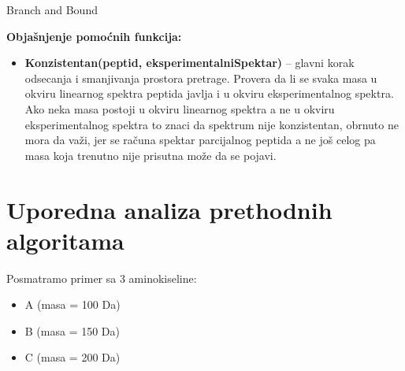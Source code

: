 \documentclass[12pt,oneside]{memoir}
\begin{document}
\begin{algorithm}[H]
\label{alg:branch_and_bound}
\caption{Branch and Bound}
\SetAlgoLined
\DontPrintSemicolon
{}
\end{algorithm}

\noindent
\textbf{Objašnjenje pomoćnih funkcija:}
\begin{itemize}
  \item \textbf{Konzistentan(peptid, eksperimentalniSpektar)} – glavni korak odsecanja i smanjivanja prostora pretrage.  Provera da li se svaka masa u okviru linearnog spektra peptida javlja i u okviru eksperimentalnog spektra. Ako neka masa postoji u okviru linearnog spektra a ne u okviru eksperimentalnog spektra to znaci da spektrum nije konzistentan, obrnuto ne mora da važi, jer se računa spektar parcijalnog peptida a ne još celog pa masa koja trenutno nije prisutna može da se pojavi.
\end{itemize}

\section{Uporedna analiza prethodnih algoritama}

Posmatramo primer sa 3 aminokiseline:
\begin{itemize}
    \item A (masa = 100 Da)
    \item B (masa = 150 Da)
    \item C (masa = 200 Da)
\end{itemize}
\end{document}
